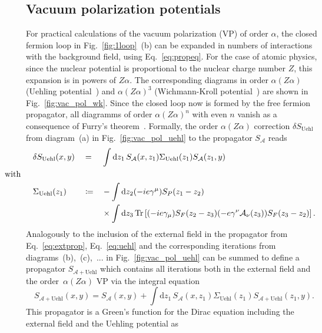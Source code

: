 \subsection{Vacuum polarization potentials}
\label{sec:vacPolTheory}
For practical calculations of the vacuum polarization (VP) of order $\alpha$, the closed fermion loop in Fig.~\ref{fig:1loop}~(b) can be expanded in numbers of interactions with the background field, using Eq.~\ref{eq:propeq}. For the case of atomic physics, since the nuclear potential is proportional to the nuclear charge number $Z$, this expansion is in powers of $Z\alpha$. The corresponding diagrams in order $\alpha(Z\alpha)$ (Uehling potential~\cite{uehling1935}) and $\alpha(Z\alpha)^3$ (Wichmann-Kroll potential~\cite{wichmann1956}) are shown in Fig.~\ref{fig:vac_pol_wk}. Since the closed loop now is formed by the free fermion propagator, all diagramms of order $\alpha(Z\alpha)^n$ with even $n$ vanish as a consequence of Furry's theorem~\mbox{\cite[Section~10.1.]{peskin1995}}. Formally, the order $\alpha (Z\alpha)$ correction $\delta S_{\text{Uehl}}$ from diagram~(a) in Fig.~\ref{fig:vac_pol_uehl} to the propagator $S_{\mathcal{A}}$ reads
\begin{alignat}{3}
\label{eq:uehl}
&\delta S_{\text{Uehl}}(x,y) &&=&& \int \mathrm{d}z_1\,S_{\mathcal{A}}(x,z_1)\Sigma_{\text{Uehl}}(z_1)S_{\mathcal{A}}(z_1,y)\\
&\hspace{-1.2cm}\text{with}\notag\\
&\Sigma_{\text{Uehl}}(z_1) &&\coloneqq&& -\int\mathrm{d}z_2(-ie\gamma^\mu)S_P(z_1-z_2)\notag\\
&&&&&\times\int\mathrm{d}z_3\,\Tr\left[(-ie\gamma_\mu)S_F(z_2-z_3)(-e\gamma^\nu \mathcal{A}_\nu (z_3))S_F(z_3-z_2)\right].\notag
\end{alignat}
Analogously to the inclusion of the external field in the propagator from Eq.~\eqref{eq:extprop}, Eq.~\eqref{eq:uehl} and the corresponding iterations from diagrams~(b),~(c),~... in Fig.~\ref{fig:vac_pol_uehl} can be summed to define a propagator $S_{\mathcal{A}+\text{Uehl}}$ which contains all iterations both in the external field and the order~$\alpha (Z\alpha)$ VP via the integral equation
\begin{equation}
S_{\mathcal{A}+\text{Uehl}}(x,y) = S_{\mathcal{A}}(x,y) +  \int \mathrm{d}z_1\,S_{\mathcal{A}}(x,z_1)\Sigma_{\text{Uehl}}(z_1)S_{\mathcal{A}+\text{Uehl}}(z_1,y).
\label{eq:uehlsum}
\end{equation}
This propagator is a Green's function for the Dirac equation including the external field and the Uehling potential as
